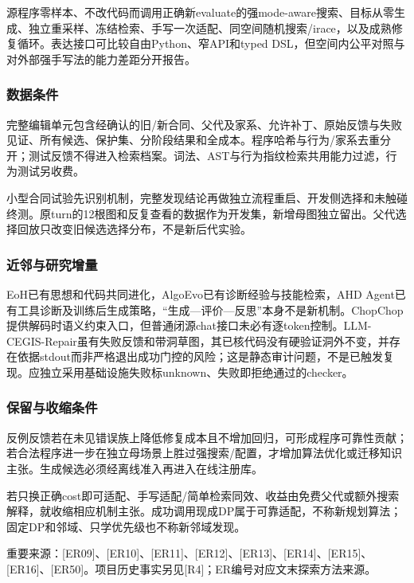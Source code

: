 \documentclass[11pt,a4paper]{article}
\newcommand{\bodytext}[1]{#1\par}
\newcommand{\sourcetext}[1]{{\fontsize{9.2}{14}\selectfont\color{Muted}#1\par}}
\begin{document}
\bodytext{源程序零样本、不改代码而调用正确新evaluate的强mode-aware搜索、目标从零生成、独立重采样、冻结检索、手写一次适配、同空间随机搜索/\allowbreak{}irace，以及成熟修复循环。表达接口可比较自由Python、窄API和typed DSL，但空间内公平对照与对外部强手写法的能力差距分开报告。}
\subsubsection{数据条件}
\bodytext{完整编辑单元包含经确认的旧/\allowbreak{}新合同、父代及家系、允许补丁、原始反馈与失败见证、所有候选、保护集、分阶段结果和全成本。程序哈希与行为/\allowbreak{}家系去重分开；测试反馈不得进入检索档案。词法、AST与行为指纹检索共用能力过滤，行为测试另收费。}
\bodytext{小型合同试验先识别机制，完整发现结论再做独立流程重启、开发侧选择和未触碰终测。原turn的12根图和反复查看的数据作为开发集，新增母图独立留出。父代选择回放只改变旧候选选择分布，不是新后代实验。}
\subsubsection{近邻与研究增量}
\bodytext{EoH已有思想和代码共同进化，AlgoEvo已有诊断经验与技能检索，AHD Agent已有工具诊断及训练后生成策略，“生成—评价—反思”本身不是新机制。ChopChop提供解码时语义约束入口，但普通闭源chat接口未必有逐token控制。LLM-CEGIS-Repair虽有失败反馈和带洞草图，其已核代码没有硬验证洞外不变，并存在依据stdout而非严格退出成功门控的风险；这是静态审计问题，不是已触发复现。应独立采用基础设施失败标unknown、失败即拒绝通过的checker。}
\subsubsection{保留与收缩条件}
\bodytext{反例反馈若在未见错误族上降低修复成本且不增加回归，可形成程序可靠性贡献；若合法程序进一步在独立母场景上胜过强搜索/\allowbreak{}配置，才增加算法优化或迁移知识主张。生成候选必须经离线准入再进入在线注册库。}
\bodytext{若只换正确cost即可适配、手写适配/\allowbreak{}简单检索同效、收益由免费父代或额外搜索解释，就收缩相应机制主张。成功调用现成DP属于可靠适配，不称新规划算法；固定DP和邻域、只学优先级也不称新邻域发现。}
\sourcetext{重要来源：[ER09]、[ER10]、[ER11]、[ER12]、[ER13]、[ER14]、[ER15]、[ER16]、[ER50]。项目历史事实另见[R4]；ER编号对应文末探索方法来源。}
\end{document}
